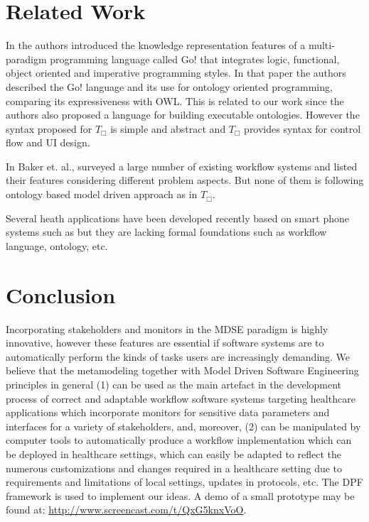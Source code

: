 \documentclass[a4paper]{llncs}
\begin{document}
\section{Related Work}\label{label:relwork}

In \cite{ClarkM06} the authors introduced the knowledge representation features of a multi-paradigm programming language called Go$!$ that integrates logic, functional, 
object oriented and imperative programming styles. In that paper the authors described the Go$!$ language and its use for ontology oriented programming, comparing its expressiveness with OWL. 
This is related to our work since the authors also proposed a language for building executable ontologies.  
However the syntax proposed for $T_{\Box}$ is simple and abstract and $T_{\Box}$ provides syntax for control flow and UI design. 

In \cite{BakerEtAl2008} Baker et. al., surveyed a large number of existing workflow systems and listed their features considering different problem aspects. 
But none of them is following ontology based model driven approach as in $T_{\Box}$. 

Several heath applications have been developed recently based on smart phone systems such as \cite{Chunming99} but they are lacking formal foundations such as workflow language, ontology, etc.

\section{Conclusion}\label{label:conclusion}

Incorporating stakeholders and monitors in the MDSE paradigm is highly innovative, however these features are essential if software systems are to automatically perform the kinds of tasks 
users are increasingly demanding.  We believe that the metamodeling together with Model Driven Software Engineering principles in general
(1) can be used as the main artefact in the development process of correct and adaptable workflow software systems  targeting healthcare applications which incorporate monitors for 
sensitive data parameters and interfaces for a variety of stakeholders, and, moreover, 
(2) can be manipulated by computer tools to automatically produce a workflow implementation which can be deployed in  healthcare settings, which can easily be  adapted to reflect the 
numerous customizations and changes required in a healthcare setting due to  requirements and limitations of local settings, updates in protocols, etc.
The DPF framework is used to implement our ideas.  A demo of a small prototype may be found at: \url{http://www.screencast.com/t/QxG5knxVoO}. 
\end{document}
